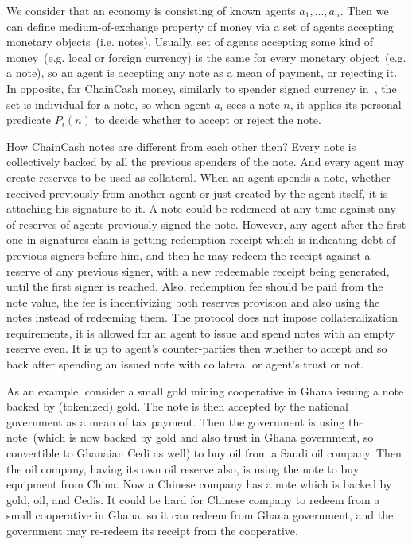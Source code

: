 \documentclass{llncs}   %
\newcommand{\cc}{ChainCash}
\begin{document}
We consider that an economy is consisting of known agents $a_1, ..., a_n$. Then we can define medium-of-exchange property of money via a set of agents accepting monetary objects~(i.e. notes). Usually, set of agents accepting some kind of money~(e.g. local or foreign currency) is the same for every monetary object~(e.g. a note), so an agent is accepting any note as a mean of payment, or rejecting it. In opposite, for \cc{} money, similarly to spender signed currency in~\cite{saito2003peer}, the set is individual for a note, so when agent $a_i$ sees a note $n$, it applies its personal predicate $P_i(n)$ to decide whether to accept or reject the note.

How \cc{} notes are different from each other then? Every note is collectively backed by all the previous spenders of the note. And every agent may create reserves to be used as collateral. When an agent spends a note, whether received previously from another agent or just created by the agent itself, it is attaching his signature to it. A note could be redemeed at any time against any of reserves of agents previously signed the note. However, any agent after the first one in signatures chain is getting redemption receipt which is indicating debt of previous signers before him, and then he may redeem the receipt against a reserve of any previous signer, with a new redeemable receipt being generated, until the first signer is reached. Also, redemption fee should be paid from the note value, the fee is incentivizing both reserves provision and also using the notes instead of redeeming them. The protocol does not impose collateralization requirements, it is allowed for an agent to issue and spend notes with an empty reserve even. It is up to agent's counter-parties then whether to accept and so back after spending an issued note with collateral or agent's trust or not.

As an example, consider a small gold mining cooperative in Ghana issuing a note backed by (tokenized) gold. The note is then accepted by the national government as a mean of tax payment. Then the government is using the note~(which is now backed by gold and also trust in Ghana government, so convertible to Ghanaian Cedi as well) to buy oil from a Saudi oil company. Then the oil company, having its own oil reserve also, is using the note to buy equipment from China. Now a Chinese company has a note which is backed by gold, oil, and Cedis. It could be hard for Chinese company to redeem from a small cooperative in Ghana, so it can redeem from Ghana government, and the government may re-redeem its receipt from the cooperative.
\end{document}
